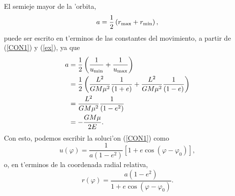 El semieje mayor de la 'orbita,
\begin{equation}
a=\frac{1}{2}\left(r_{\rm max}+r_{\rm min}\right),
\end{equation}
puede ser escrito en t'erminos de las constantes del movimiento, a partir de (\ref{CON1}) y (\ref{ex}), ya que
\begin{align}
a & = \frac{1}{2}\left(\frac{1}{u_{\rm min}}+\frac{1}{u_{\rm max}}\right) \\
& = \frac{1}{2}\left(\frac{L^2}{GM\mu^2}\frac{1}{(1+e)}+\frac{L^2}{GM\mu^2}\frac{1}{(1-e)}\right) \\
& = \frac{L^2}{GM\mu^2}\frac{1}{(1-e^2)} \\
& = -\frac{GM\mu}{2E}. \label{aE}
\end{align}
Con esto, podemos escribir la soluci'on (\ref{CON1}) como
\begin{equation}
u(\varphi)=\frac{1}{a(1-e^2)}\left[1+e\cos
(\varphi-\varphi_0)\right],
\end{equation}
o, en t'erminos de la coordenada radial relativa,
\begin{equation}\label{rphi}
\boxed{r(\varphi)=\frac{a(1-e^2)}{1+e\cos(\varphi-\varphi_0)}.}
\end{equation}

